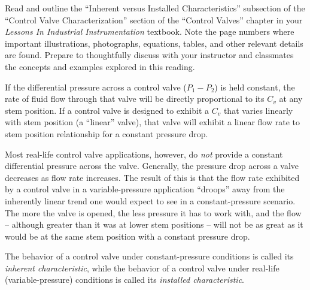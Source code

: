 

Read and outline the ``Inherent versus Installed Characteristics'' subsection of the ``Control Valve Characterization'' section of the ``Control Valves'' chapter in your {\it Lessons In Industrial Instrumentation} textbook.  Note the page numbers where important illustrations, photographs, equations, tables, and other relevant details are found.  Prepare to thoughtfully discuss with your instructor and classmates the concepts and examples explored in this reading.














If the differential pressure across a control valve ($P_1 - P_2$) is held constant, the rate of fluid flow through that valve will be directly proportional to its $C_v$ at any stem position.  If a control valve is designed to exhibit a $C_v$ that varies linearly with stem position (a ``linear'' valve), that valve will exhibit a linear flow rate to stem position relationship for a constant pressure drop.

\vskip 10pt

Most real-life control valve applications, however, do {\it not} provide a constant differential pressure across the valve.  Generally, the pressure drop across a valve decreases as flow rate increases.  The result of this is that the flow rate exhibited by a control valve in a variable-pressure application ``droops'' away from the inherently linear trend one would expect to see in a constant-pressure scenario.  The more the valve is opened, the less pressure it has to work with, and the flow -- although greater than it was at lower stem positions -- will not be as great as it would be at the same stem position with a constant pressure drop.

\vskip 10pt

The behavior of a control valve under constant-pressure conditions is called its {\it inherent characteristic}, while the behavior of a control valve under real-life (variable-pressure) conditions is called its {\it installed characteristic}.






